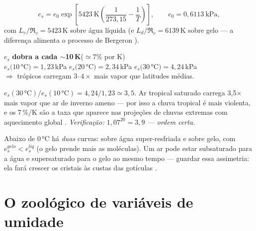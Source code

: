 \documentclass[11pt]{article}
\begin{document}
\begin{formalivro}[Stull eq.~4.1]
\[ e_s = e_0 \exp\!\left[ 5423\ \mathrm{K}\left(\frac{1}{273{,}15}
 - \frac{1}{T}\right)\right],\qquad e_0 = 0{,}6113\ \mathrm{kPa}, \]
com $L_v/\Re_v = 5423$\,K sobre água líquida (e $L_d/\Re_v = 6139$\,K sobre
gelo — a diferença alimenta o processo de Bergeron
).
\end{formalivro}

\begin{noquadro}
$e_s$ \textbf{dobra a cada $\sim$10\,K}\quad ($\simeq 7\%$ por K)\\[2pt]
$e_s(10\,°$C$) = 1{,}23$\,kPa \quad $e_s(20\,°$C$) = 2{,}34$\,kPa \quad
$e_s(30\,°$C$) = 4{,}24$\,kPa\\[2pt]
$\Rightarrow$ trópicos carregam $3$--$4\times$ mais vapor que latitudes
médias.
\end{noquadro}

\begin{exemplo}
$e_s(30\,°\mathrm{C})/e_s(10\,°\mathrm{C}) = 4{,}24/1{,}23 \simeq 3{,}5$.
Ar tropical saturado carrega 3,5$\times$ mais vapor que ar de inverno
ameno — por isso a chuva tropical é mais violenta, e os 7\,\%/K são a taxa
que aparece nas projeções de chuvas extremas com aquecimento global
.
\emph{Verificação: $1{,}07^{20} = 3{,}9$ — ordem certa.}
\end{exemplo}

Abaixo de 0\,°C há \emph{duas} curvas: sobre água super-resfriada e sobre
gelo, com $e_s^{gelo} < e_s^{liq}$ (o gelo prende mais as moléculas). Um
ar pode estar subsaturado para a água e supersaturado para o gelo ao mesmo
tempo — guardar essa assimetria: ela fará crescer os cristais às custas
das gotículas .

\section{O zoológico de variáveis de umidade}\label{sec:variaveis}

\end{document}
